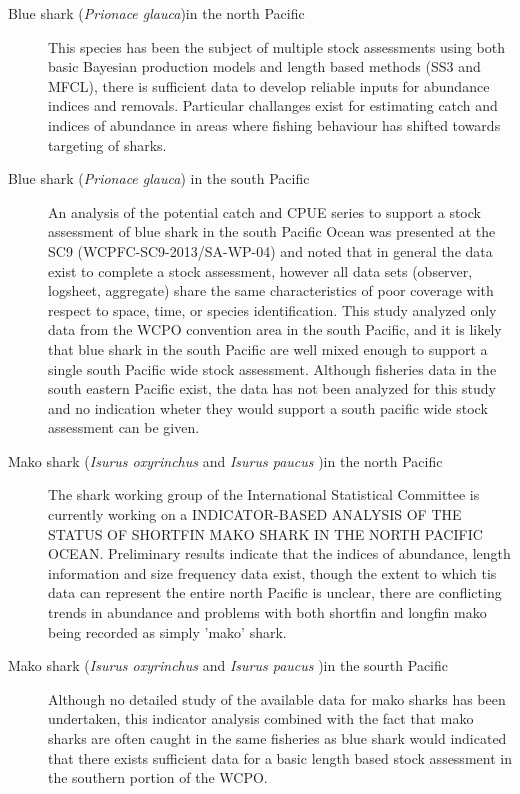 \documentclass[12pt]{SCreport}
\begin{document}
\begin{description}
  \item[Blue shark (\emph{Prionace glauca})in the north Pacific] This species has been the subject of multiple stock assessments using both basic Bayesian production models and length based methods (SS3 and MFCL), there is sufficient data to develop reliable inputs for abundance indices and removals. Particular challanges exist for estimating catch and indices of abundance in areas where  fishing behaviour has shifted towards targeting of sharks.
  
\item[Blue shark (\emph{Prionace glauca}) in the south Pacific]
An analysis of the potential catch and CPUE series to support a stock assessment of blue shark in the south Pacific Ocean was presented at the  SC9 (WCPFC-SC9-2013/SA-WP-04) and noted that in general the data exist to complete a stock assessment, however all  data sets (observer, logsheet, aggregate) share the same characteristics of poor coverage with respect to space, time, or species identification.  This study analyzed only  data from the WCPO convention area in the south Pacific, and it is likely that blue shark in the south Pacific are well mixed enough to support a single south Pacific wide stock assessment. Although fisheries data in the south  eastern Pacific exist, the data has not been analyzed for this  study and no indication wheter they would support  a south pacific wide stock assessment can be given.

\item[Mako shark (\emph{Isurus oxyrinchus} and \emph{Isurus paucus} )in the north Pacific] The shark working group of the International Statistical Committee is currently working on a INDICATOR-BASED ANALYSIS OF THE STATUS OF SHORTFIN MAKO SHARK IN THE NORTH PACIFIC OCEAN. Preliminary results indicate that the indices of abundance, length information and size frequency data exist, though the extent to which tis data can represent the   entire north Pacific is unclear, there are conflicting trends in abundance and problems with both shortfin and longfin mako being recorded as simply 'mako' shark.

\item[Mako shark (\emph{Isurus oxyrinchus} and \emph{Isurus paucus} )in the sourth Pacific] Although no detailed study of the available data for mako sharks has been undertaken, this indicator analysis combined with the fact that mako sharks are often caught in the same fisheries as blue shark would indicated that there exists sufficient data for a basic length based stock assessment in the southern portion of the WCPO. 


\end{description}
\end{document}

